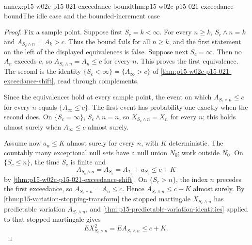 \begin{annexitem}{annex:p15-w02c-p15-021-exceedance-bound}{thm:p15-w02c-p15-021-exceedance-bound}{The idle case and the bounded-increment case}
\begin{proof}
Fix a sample point. Suppose first \(S_c=k<\infty\). For every
\(n\geq k\), \(S_c\wedge n=k\) and \(A_{S_c\wedge n}=A_k>c\). Thus the
bound fails for all \(n\geq k\), and the first statement on the left
of the displayed equivalences is false. Suppose next \(S_c=\infty\).
Then no \(A_n\) exceeds \(c\), so \(A_{S_c\wedge n}=A_n\leq c\) for every
\(n\). This proves the first equivalence. The second is the identity
\(\{S_c<\infty\}=\{A_\infty>c\}\) of
\cref{thm:p15-w02c-p15-021-exceedance-shift}, read through complements.

Since the equivalences hold at every sample point, the event on which
\(A_{S_c\wedge n}\leq c\) for every \(n\) equals \(\{A_\infty\leq c\}\).
The first event has probability one exactly when the second does. On
\(\{S_c=\infty\}\), \(S_c\wedge n=n\), so \(X_{S_c\wedge n}=X_n\) for
every \(n\); this holds almost surely when \(A_\infty\leq c\) almost
surely.

Assume now \(a_n\leq K\) almost surely for every \(n\), with \(K\)
deterministic. The countably many exceptional null sets have a null
union \(N_0\); work outside \(N_0\). On \(\{S_c\leq n\}\), the time
\(S_c\) is finite and
\[
 A_{S_c\wedge n}=A_{S_c}=A_{T_c}+a_{S_c}\leq c+K
\]
by \cref{thm:p15-w02c-p15-021-exceedance-shift}. On \(\{S_c>n\}\),
the index \(n\) precedes the first exceedance, so
\(A_{S_c\wedge n}=A_n\leq c\). Hence \(A_{S_c\wedge n}\leq c+K\) almost
surely. By \cref{thm:p15-variation-stopping-transform} the stopped
martingale \(X_{S_c\wedge n}\) has predictable variation
\(A_{S_c\wedge n}\), and \cref{thm:p15-predictable-variation-identities}
applied to that stopped martingale gives
\[
 EX_{S_c\wedge n}^2=EA_{S_c\wedge n}\leq c+K .
\]
\end{proof}
\end{annexitem}

